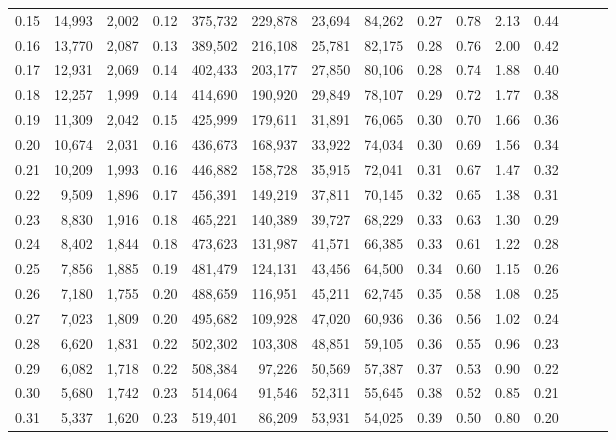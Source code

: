 \begin{tabular}{rrrrrrrrrrrrrrr}
0.15 &  14,993 &  2,002 &  0.12 &  375,732 &  229,878 &   23,694 &   84,262 &  0.27 &  0.78 &  2.13 &      0.44 \\
0.16 &  13,770 &  2,087 &  0.13 &  389,502 &  216,108 &   25,781 &   82,175 &  0.28 &  0.76 &  2.00 &      0.42 \\
0.17 &  12,931 &  2,069 &  0.14 &  402,433 &  203,177 &   27,850 &   80,106 &  0.28 &  0.74 &  1.88 &      0.40 \\
0.18 &  12,257 &  1,999 &  0.14 &  414,690 &  190,920 &   29,849 &   78,107 &  0.29 &  0.72 &  1.77 &      0.38 \\
0.19 &  11,309 &  2,042 &  0.15 &  425,999 &  179,611 &   31,891 &   76,065 &  0.30 &  0.70 &  1.66 &      0.36 \\
0.20 &  10,674 &  2,031 &  0.16 &  436,673 &  168,937 &   33,922 &   74,034 &  0.30 &  0.69 &  1.56 &      0.34 \\
0.21 &  10,209 &  1,993 &  0.16 &  446,882 &  158,728 &   35,915 &   72,041 &  0.31 &  0.67 &  1.47 &      0.32 \\
0.22 &   9,509 &  1,896 &  0.17 &  456,391 &  149,219 &   37,811 &   70,145 &  0.32 &  0.65 &  1.38 &      0.31 \\
0.23 &   8,830 &  1,916 &  0.18 &  465,221 &  140,389 &   39,727 &   68,229 &  0.33 &  0.63 &  1.30 &      0.29 \\
0.24 &   8,402 &  1,844 &  0.18 &  473,623 &  131,987 &   41,571 &   66,385 &  0.33 &  0.61 &  1.22 &      0.28 \\
0.25 &   7,856 &  1,885 &  0.19 &  481,479 &  124,131 &   43,456 &   64,500 &  0.34 &  0.60 &  1.15 &      0.26 \\
0.26 &   7,180 &  1,755 &  0.20 &  488,659 &  116,951 &   45,211 &   62,745 &  0.35 &  0.58 &  1.08 &      0.25 \\
0.27 &   7,023 &  1,809 &  0.20 &  495,682 &  109,928 &   47,020 &   60,936 &  0.36 &  0.56 &  1.02 &      0.24 \\
0.28 &   6,620 &  1,831 &  0.22 &  502,302 &  103,308 &   48,851 &   59,105 &  0.36 &  0.55 &  0.96 &      0.23 \\
0.29 &   6,082 &  1,718 &  0.22 &  508,384 &   97,226 &   50,569 &   57,387 &  0.37 &  0.53 &  0.90 &      0.22 \\
0.30 &   5,680 &  1,742 &  0.23 &  514,064 &   91,546 &   52,311 &   55,645 &  0.38 &  0.52 &  0.85 &      0.21 \\
0.31 &   5,337 &  1,620 &  0.23 &  519,401 &   86,209 &   53,931 &   54,025 &  0.39 &  0.50 &  0.80 &      0.20 \\

\end{tabular}
